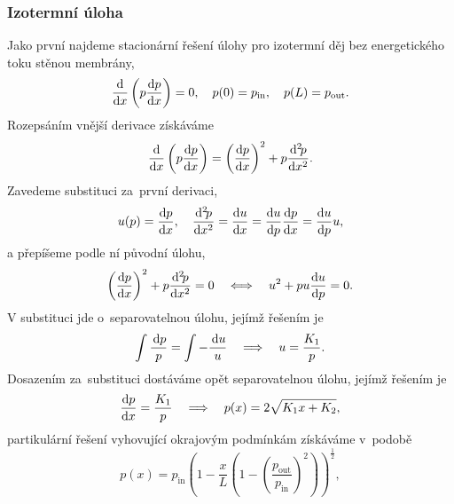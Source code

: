 \subsubsection{Izotermní úloha}\label{sss:izotermni_uloha}
Jako první najdeme stacionární řešení úlohy pro izotermní děj bez energetického toku stěnou membrány, 
\begin{equation}\label{eq:izotermal_problem}
    \frac{\mathrm{d} }{\mathrm{d} x}\left(p\frac{\mathrm{d} p}{\mathrm{d} x}\right)=0,\quad p(0)=p_{\mathrm{in}},\quad p(L)=p_{\mathrm{out}}.
\end{equation}
Rozepsáním vnější derivace získáváme
\begin{equation}
    \frac{\mathrm{d} }{\mathrm{d} x}\left(p\frac{\mathrm{d} p}{\mathrm{d} x}\right)=\left(\frac{\mathrm{d} p}{\mathrm{d} x}\right)^2+p\frac{\mathrm{d}^2 \! p}{\mathrm{d} x^2}.
\end{equation}
Zavedeme substituci za~první derivaci,
\begin{equation}\label{eq:dpdx_substitution}
    u(p)=\frac{\mathrm{d} p}{\mathrm{d} x},\quad \frac{\mathrm{d}^2 \! p}{\mathrm{d} x^2}=\frac{\mathrm{d} u}{\mathrm{d} x}=\frac{\mathrm{d} u}{\mathrm{d} p}\frac{\mathrm{d} p}{\mathrm{d} x}=\frac{\mathrm{d} u}{\mathrm{d} p}u,
\end{equation}
a přepíšeme podle ní původní úlohu,
\begin{equation}
    \left(\frac{\mathrm{d} p}{\mathrm{d} x}\right)^2+p\frac{\mathrm{d}^2 \! p}{\mathrm{d} x^2}=0\quad\Longleftrightarrow\quad u^2+pu\frac{\mathrm{d} u}{\mathrm{d} p}=0.
\end{equation}
V substituci jde o~separovatelnou úlohu, jejímž řešením je
\begin{equation}
    \int \frac{\,\mathrm{d}{p}}{p}=\int-\frac{\,\mathrm{d}{u}}{u}\quad\Longrightarrow\quad u=\frac{K_1}{p}.
\end{equation}
Dosazením za~substituci dostáváme opět separovatelnou úlohu, jejímž řešením je
\begin{equation}
    \frac{\mathrm{d} p}{\mathrm{d} x}=\frac{K_1}{p}\quad\Longrightarrow\quad 
    p(x)=2\sqrt{K_1x +K_2},
\end{equation}
partikulární řešení vyhovující okrajovým podmínkám získáváme v~podobě
\begin{equation}
    p(x)=p_{\mathrm{in}}\left(1-\frac{x}{L}\left(1-\left(\frac{p_{\mathrm{out}}}{p_{\mathrm{in}}}\right)^2\right)\right)^{\frac{1}{2}}, 
\end{equation}

